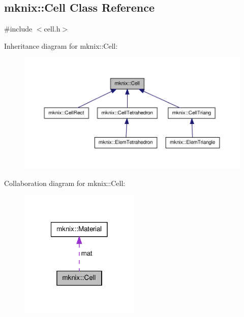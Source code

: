 \hypertarget{classmknix_1_1_cell}{\subsection{mknix\-:\-:Cell Class Reference}
\label{classmknix_1_1_cell}
}


{\ttfamily \#include $<$cell.\-h$>$}



Inheritance diagram for mknix\-:\-:Cell\-:\nopagebreak
\begin{figure}[H]
\begin{center}
\leavevmode
\includegraphics[width=350pt]{d4/d8c/classmknix_1_1_cell__inherit__graph}
\end{center}
\end{figure}


Collaboration diagram for mknix\-:\-:Cell\-:\nopagebreak
\begin{figure}[H]
\begin{center}
\leavevmode
\includegraphics[width=162pt]{d0/d8c/classmknix_1_1_cell__coll__graph}
\end{center}
\end{figure}
